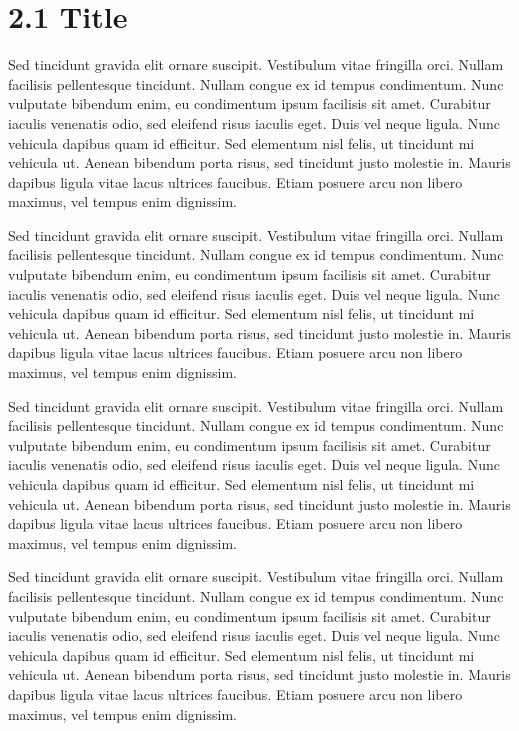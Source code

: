 \section{2.1 Title}
Sed tincidunt gravida elit ornare suscipit. Vestibulum vitae fringilla orci. Nullam facilisis pellentesque tincidunt. Nullam congue ex id tempus condimentum. Nunc vulputate bibendum enim, eu condimentum ipsum facilisis sit amet. Curabitur iaculis venenatis odio, sed eleifend risus iaculis eget. Duis vel neque ligula. Nunc vehicula dapibus quam id efficitur. Sed elementum nisl felis, ut tincidunt mi vehicula ut. Aenean bibendum porta risus, sed tincidunt justo molestie in. Mauris dapibus ligula vitae lacus ultrices faucibus. Etiam posuere arcu non libero maximus, vel tempus enim dignissim. \par
Sed tincidunt gravida elit ornare suscipit. Vestibulum vitae fringilla orci. Nullam facilisis pellentesque tincidunt. Nullam congue ex id tempus condimentum. Nunc vulputate bibendum enim, eu condimentum ipsum facilisis sit amet. Curabitur iaculis venenatis odio, sed eleifend risus iaculis eget. Duis vel neque ligula. Nunc vehicula dapibus quam id efficitur. Sed elementum nisl felis, ut tincidunt mi vehicula ut. Aenean bibendum porta risus, sed tincidunt justo molestie in. Mauris dapibus ligula vitae lacus ultrices faucibus. Etiam posuere arcu non libero maximus, vel tempus enim dignissim. \par
Sed tincidunt gravida elit ornare suscipit. Vestibulum vitae fringilla orci. Nullam facilisis pellentesque tincidunt. Nullam congue ex id tempus condimentum. Nunc vulputate bibendum enim, eu condimentum ipsum facilisis sit amet. Curabitur iaculis venenatis odio, sed eleifend risus iaculis eget. Duis vel neque ligula. Nunc vehicula dapibus quam id efficitur. Sed elementum nisl felis, ut tincidunt mi vehicula ut. Aenean bibendum porta risus, sed tincidunt justo molestie in. Mauris dapibus ligula vitae lacus ultrices faucibus. Etiam posuere arcu non libero maximus, vel tempus enim dignissim. \par
Sed tincidunt gravida elit ornare suscipit. Vestibulum vitae fringilla orci. Nullam facilisis pellentesque tincidunt. Nullam congue ex id tempus condimentum. Nunc vulputate bibendum enim, eu condimentum ipsum facilisis sit amet. Curabitur iaculis venenatis odio, sed eleifend risus iaculis eget. Duis vel neque ligula. Nunc vehicula dapibus quam id efficitur. Sed elementum nisl felis, ut tincidunt mi vehicula ut. Aenean bibendum porta risus, sed tincidunt justo molestie in. Mauris dapibus ligula vitae lacus ultrices faucibus. Etiam posuere arcu non libero maximus, vel tempus enim dignissim. \par
